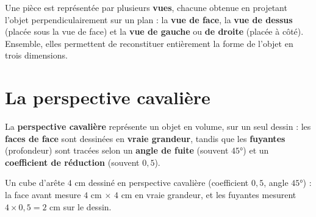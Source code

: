 \begin{definition}
Une pièce est représentée par plusieurs \textbf{vues}, chacune obtenue en projetant
l'objet perpendiculairement sur un plan : la \textbf{vue de face}, la \textbf{vue de
dessus} (placée sous la vue de face) et la \textbf{vue de gauche} ou \textbf{de droite}
(placée à côté). Ensemble, elles permettent de reconstituer entièrement la forme de
l'objet en trois dimensions.
\end{definition}

\begin{illus}
\end{illus}

\section{La perspective cavalière}

\begin{definition}
La \textbf{perspective cavalière} représente un objet en volume, sur un seul dessin : les
\textbf{faces de face} sont dessinées en \textbf{vraie grandeur}, tandis que les
\textbf{fuyantes} (profondeur) sont tracées selon un \textbf{angle de fuite} (souvent
$45°$) et un \textbf{coefficient de réduction} (souvent $0{,}5$).
\end{definition}

\begin{exemple}
Un cube d'arête $4$ cm dessiné en perspective cavalière (coefficient $0{,}5$, angle
$45°$) : la face avant mesure $4$ cm $\times$ $4$ cm en vraie grandeur, et les fuyantes
mesurent $4\times0{,}5=2$ cm sur le dessin.
\end{exemple}

